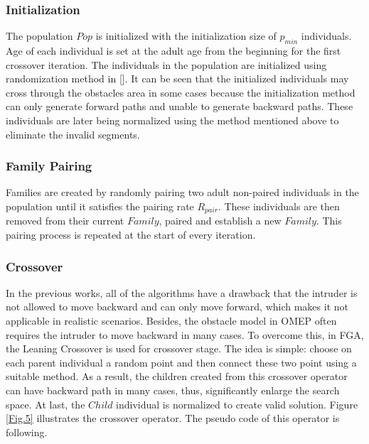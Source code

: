 \documentclass[final]{elsarticle}
\begin{document}
\subsubsection{Initialization}

The population $Pop$ is initialized with the initialization size of $p_{min}$ individuals. Age of each individual is set at the adult age from the beginning for the first crossover iteration. The individuals in the population are initialized using randomization method in []. It can be seen that the initialized individuals may cross through the obstacles area in some cases because the initialization method can only generate forward paths and unable to generate backward paths. These individuals are later being normalized using the method mentioned above to eliminate the invalid segments.

\subsubsection{Family Pairing}

Families are created by randomly pairing two adult non-paired individuals in the population until it satisfies the pairing rate $R_{pair}$. These individuals are then removed from their current $ Family $, paired and establish a new $Family$. This pairing process is repeated at the start of every iteration.

\subsubsection{Crossover}

In the previous works, all of the algorithms have a drawback that the intruder is not allowed to move backward and can only move forward, which makes it not applicable in realistic scenarios. Besides, the obstacle model in OMEP often requires the intruder to move backward in many cases. To overcome this, in FGA, the Leaning Crossover is used for crossover stage. The idea is simple: choose on each parent individual a random point and then connect these two point using a suitable method. As a result, the children created from this crossover operator can have backward path in many cases, thus, significantly enlarge the search space. At last, the $Child$ individual is normalized to create valid solution. Figure \ref{Fig.5} illustrates the crossover operator. The pseudo code of this operator is following.
\end{document}
